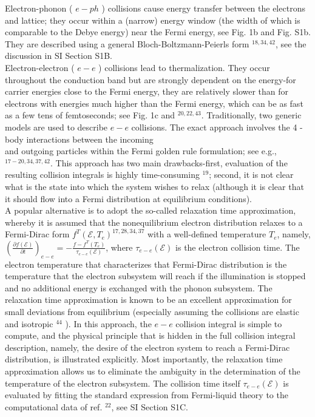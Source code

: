 \documentclass[10pt]{article}
\begin{document}
Electron-phonon ( $e-p h$ ) collisions cause energy transfer between the electrons and lattice; they occur within a (narrow) energy window (the width of which is comparable to the Debye energy) near the Fermi energy, see Fig. 1b and Fig. S1b. They are described using a general Bloch-Boltzmann-Peierls form ${ }^{18,34,42}$, see the discussion in SI Section S1B.\\
Electron-electron ( $e-e$ ) collisions lead to thermalization. They occur throughout the conduction band but are strongly dependent on the energy-for carrier energies close to the Fermi energy, they are relatively slower than for electrons with energies much higher than the Fermi energy, which can be as fast as a few tens of femtoseconds; see Fig. 1c and ${ }^{20,22,43}$. Traditionally, two generic models are used to describe $e-e$ collisions. The exact approach involves the 4 -body interactions between the incoming\\
and outgoing particles within the Fermi golden rule formulation; see e.g., ${ }^{17-20,34,37,42}$. This approach has two main drawbacks-first, evaluation of the resulting collision integrals is highly time-consuming ${ }^{19}$; second, it is not clear what is the state into which the system wishes to relax (although it is clear that it should flow into a Fermi distribution at equilibrium conditions).\\
A popular alternative is to adopt the so-called relaxation time approximation, whereby it is assumed that the nonequilibrium electron distribution relaxes to a Fermi-Dirac form $f^{T}\left(\mathcal{E}, T_{e}\right)^{17,28,34,37}$ with a well-defined temperature $T_{e}$, namely, $\left(\frac{\partial f(\mathcal{E})}{\partial t}\right)_{e-e}=-\frac{f-f^{T}\left(T_{e}\right)}{\tau_{e-e}(\mathcal{E})}$, where $\tau_{e-e}(\mathcal{E})$ is the electron collision time. The electron temperature that characterizes that Fermi-Dirac distribution is the temperature that the electron subsystem will reach if the illumination is stopped and no additional energy is exchanged with the phonon subsystem. The relaxation time approximation is known to be an excellent approximation for small deviations from equilibrium (especially assuming the collisions are elastic and isotropic ${ }^{44}$ ). In this approach, the $e-e$ collision integral is simple to compute, and the physical principle that is hidden in the full collision integral description, namely, the desire of the electron system to reach a Fermi-Dirac distribution, is illustrated explicitly. Most importantly, the relaxation time approximation allows us to eliminate the ambiguity in the determination of the temperature of the electron subsystem. The collision time itself $\tau_{e-e}(\mathcal{E})$ is evaluated by fitting the standard expression from Fermi-liquid theory to the computational data of ref. ${ }^{22}$, see SI Section S1C.\\
\end{document}
